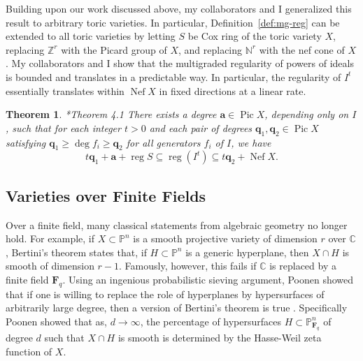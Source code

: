 \documentclass[11pt,reqno]{amsart}
\newtheorem{theorem}[lemma]{Theorem}
\theoremstyle{remark}
\newcommand{\reg}{\operatorname{reg}}
\newcommand{\Pic}{\operatorname{Pic}}
\newcommand{\Nef}{\operatorname{Nef}}
\renewcommand{\aa}{\mathbf a}
\newcommand{\qq}{\mathbf q}
\newcommand{\fF}{\mathbf F}
\newcommand{\C}{\mathbb{C}}
\newcommand{\N}{\mathbb{N}}
\renewcommand{\P}{\mathbb{P}}
\newcommand{\Z}{\mathbb{Z}}
\newcommand{\juliette}[1]{{\color{red} \sf $\spadesuit\spadesuit\spadesuit$ Juliette: [#1]}}
\begin{document}
Building upon our work discussed above, my collaborators and I generalized this result to arbitrary toric varieties. In particular, Definition~\ref{def:mg-reg} can be extended to all toric varieties by letting $S$ be Cox ring of the toric variety $X$, replacing $\Z^r$ with the Picard group of $X$, and replacing $\N^{r}$ with the nef cone of $X$. My collaborators and I show that the multigraded regularity of powers of ideals is bounded and translates in a predictable way. In particular, the regularity of $I^{t}$ essentially translates within $\Nef X$ in fixed directions at a linear rate.


 

\begin{theorem}\cite{bruceHellerSayrafi22}*{Theorem 4.1}
  There exists a degree $\aa\in\Pic X$, depending only on $I$, such that for each integer $t>0$ and each pair of degrees $\qq_1,\qq_2\in\Pic X$ satisfying $\qq_1\geq\deg f_i\geq\qq_2$ for all generators $f_i$ of $I$, we have
	\[ t\qq_1+\aa+\reg S \subseteq \reg\!\left(I^t\right) \subseteq t\qq_2+\Nef X. \]
\end{theorem}


\subsection{Varieties over Finite Fields}\label{subsec:finite-fields}

Over a finite field, many classical statements from algebraic geometry no longer hold. For example, if $X\subset\P^n$ is a smooth projective variety of dimension $r$ over $\C$, Bertini's theorem states that, if $H\subset \P^n$ is a generic hyperplane, then $X\cap H$ is smooth of dimension $r-1$. Famously, however, this fails if $\C$ is replaced by a finite field $\fF_{q}$. Using an ingenious probabilistic sieving argument, Poonen showed that if one is willing to replace the role of hyperplanes by hypersurfaces of arbitrarily large degree, then a version of Bertini's theorem is true \cite{poonen04}. Specifically Poonen showed that as, $d\to\infty$, the percentage of hypersurfaces $H\subset \P_{\fF_{q}}^{n}$ of degree $d$ such that $X\cap H$ is smooth is determined by the Hasse-Weil zeta function of $X$.
\end{document}
